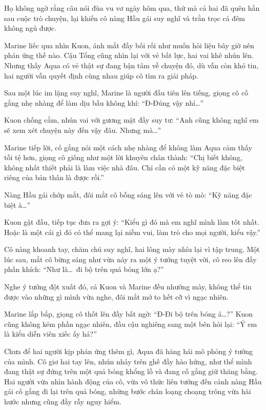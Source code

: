 \documentclass[../main.tex]{subfiles}
\begin{document}
Họ không ngờ rằng câu nói đùa vu vơ ngày hôm qua, thứ mà cả hai đã quên hẳn sau cuộc trò chuyện, lại khiến cô nàng Hầu gái suy nghĩ và trằn trọc cả đêm không ngủ được.

Marine liếc qua nhìn Kuon, ánh mắt đầy bối rối như muốn hỏi liệu bây giờ nên phản ứng thế nào. Cậu Tổng cũng nhìn lại với vẻ bất lực, hai vai khẽ nhún lên. Nhưng thấy Aqua có vẻ thật sự đang bận tâm về chuyện đó, dù vẫn còn khó tin, hai người vẫn quyết định cùng nhau giúp cô tìm ra giải pháp.

Sau một lúc im lặng suy nghĩ, Marine là người đầu tiên lên tiếng, giọng cô cố gắng nhẹ nhàng để làm dịu bầu không khí: ``Đ-Đúng vậy nhỉ\dots''

Kuon chống cằm, nhún vai với gương mặt đầy suy tư: ``Anh cũng không nghĩ em sẽ xem xét chuyện này đến vậy đâu. Nhưng mà\dots''

Marine tiếp lời, cố gắng nói một cách nhẹ nhàng để không làm Aqua cảm thấy tồi tệ hơn, giọng cô giống như một lời khuyên chân thành: ``Chị biết không, không nhất thiết phải là làm việc nhà đâu. Chỉ cần có một kỹ năng đặc biệt riêng của bản thân là được rồi.''

Nàng Hầu gái chớp mắt, đôi mắt cô bỗng sáng lên với vẻ tò mò: ``Kỹ năng đặc biệt à\dots''

Kuon gật đầu, tiếp tục đưa ra gợi ý: ``Kiểu gì đó mà em nghĩ mình làm tốt nhất. Hoặc là một cái gì đó có thể mang lại niềm vui, làm trò cho mọi người, kiểu vậy.''

Cô nàng khoanh tay, chăm chú suy nghĩ, hai lông mày nhíu lại vì tập trung. Một lúc sau, mắt cô bừng sáng như vừa nảy ra một ý tưởng tuyệt vời, cô reo lên đầy phấn khích: ``Như là\dots\ đi bộ trên quả bóng lớn ạ?''

Nghe ý tưởng đột xuất đó, cả Kuon và Marine đều nhướng mày, không thể tin được vào những gì mình vừa nghe, đôi mắt mở to hết cỡ vì ngạc nhiên.

Marine lắp bắp, giọng cô thốt lên đầy bất ngờ: ``Đ-Đi bộ trên bóng á\dots?'' Kuon cũng không kém phần ngạc nhiên, đầu cậu nghiêng sang một bên hỏi lại: ``Ý em là kiểu diễn viên xiếc ấy hả?''

Chưa để hai người kịp phản ứng thêm gì, Aqua đã hăng hái mô phỏng ý tưởng của mình. Cô giơ hai tay lên, nhún nhảy trên ghế đầy hào hứng, như thể mình đang thật sự đứng trên một quả bóng khổng lồ và đang cố gắng giữ thăng bằng. Hai người vừa nhìn hành động của cô, vừa vô thức liên tưởng đến cảnh nàng Hầu gái cố gắng đi lại trên quả bóng, những bước chân loạng choạng trông vừa hài hước nhưng cũng đầy rẫy nguy hiểm.
\end{document}
